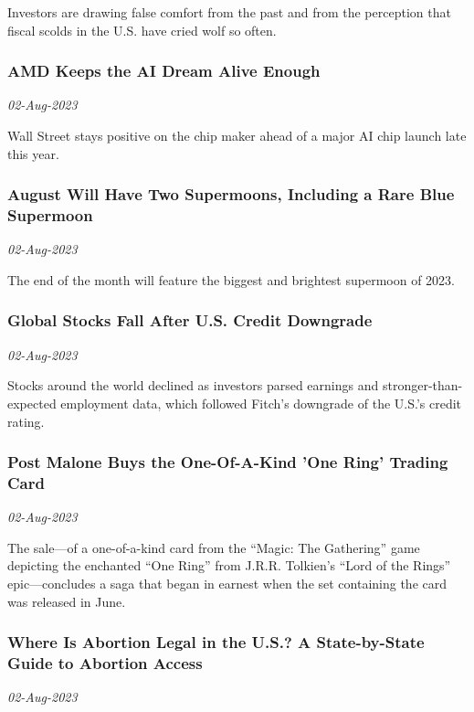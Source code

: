 Investors are drawing false comfort from the past and from the perception that fiscal scolds in the U.S. have cried wolf so often.
\subsubsection{AMD Keeps the AI Dream Alive Enough \href{https://www.wsj.com/articles/amd-keeps-the-ai-dream-alive-enough-36f95a84}{}}
\textit{02-Aug-2023}

Wall Street stays positive on the chip maker ahead of a major AI chip launch late this year.
\subsubsection{August Will Have Two Supermoons, Including a Rare Blue Supermoon \href{https://www.wsj.com/articles/are-blue-supermoon-sturgeon-august-2e9fa457}{}}
\textit{02-Aug-2023}

The end of the month will feature the biggest and brightest supermoon of 2023.
\subsubsection{Global Stocks Fall After U.S. Credit Downgrade \href{https://www.wsj.com/articles/dollar-bond-yields-fall-while-stock-futures-rise-a40466d1}{}}
\textit{02-Aug-2023}

Stocks around the world declined as investors parsed earnings and stronger-than-expected employment data, which followed Fitch’s downgrade of the U.S.’s credit rating.
\subsubsection{Post Malone Buys the One-Of-A-Kind 'One Ring' Trading Card \href{https://www.wsj.com/articles/post-malone-buys-the-one-of-a-kind-one-ring-trading-card-9762c32e}{}}
\textit{02-Aug-2023}

The sale—of a one-of-a-kind card from the “Magic: The Gathering” game depicting the enchanted “One Ring” from J.R.R. Tolkien’s “Lord of the Rings” epic—concludes a saga that began in earnest when the set containing the card was released in June.
\subsubsection{Where Is Abortion Legal in the U.S.? A State-by-State Guide to Abortion Access \href{https://www.wsj.com/articles/abortion-state-guide-laws-bf5072da}{}}
\textit{02-Aug-2023}

